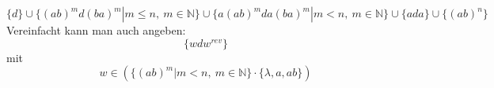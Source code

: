 \[\{d\}\cup \{(ab)^md(ba)^m|m\leq n,\ m\in\mathbb{N}\} \cup \{a(ab)^mda(ba)^m|m< n,\ m\in\mathbb{N}\} \cup \{ada\}\cup \{(ab)^n\}\]
Vereinfacht kann man auch angeben:
\[\{wdw^{rev}\}\]
mit
\[w\in \left(\{(ab)^m|m<n,\ m\in\mathbb{N}\}\cdot \{\lambda,a,ab\}\right) \]